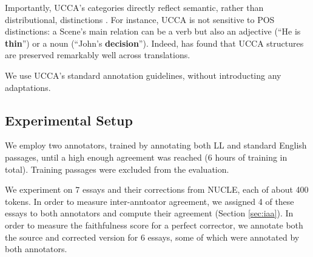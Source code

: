 \documentclass[letter,11pt]{article}
\begin{document}
Importantly, UCCA's categories directly reflect semantic, rather than distributional, distinctions .
For instance, UCCA is not sensitive to POS distinctions: a Scene's main relation can be a verb but also an adjective
(``He is {\bf thin}'') or a noun (``John's {\bf decision}'').
Indeed,  has found
that UCCA structures are preserved remarkably well across translations.

We use UCCA's standard annotation guidelines, without introducting any adaptations.

\subsection{Experimental Setup}

We employ two annotators, trained by annotating both LL and standard English
passages, until a high enough agreement was reached (6 hours of training in total).
Training passages were excluded from the evaluation.

We experiment on 7 essays and their corrections from NUCLE, each of about 400 tokens.
In order to measure inter-anntoator agreement, we assigned 4 of these essays to both annotators
and compute their agreement (Section \ref{sec:iaa}).
In order to measure the faithfulness score for a perfect corrector, we annotate both
the source and corrected version for 6 essays, some of which were annotated by
both annotators.



\end{document}
